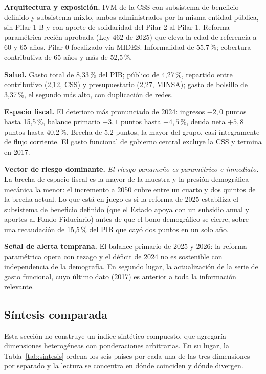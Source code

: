 \documentclass[12pt, letterpaper]{article}
\begin{document}
\textbf{Arquitectura y exposición.} IVM de la CSS con subsistema de beneficio
definido y subsistema mixto, ambos administrados por la misma entidad pública, sin
Pilar 1-B y con aporte de solidaridad del Pilar 2 al Pilar 1. Reforma paramétrica
recién aprobada (Ley 462 de 2025) que eleva la edad de referencia a 60 y 65 años.
Pilar 0 focalizado vía MIDES. Informalidad de 55,7\,\%; cobertura contributiva de
65 años y más de 52,5\,\%.

\textbf{Salud.} Gasto total de 8,33\,\% del PIB; público de 4,27\,\%, repartido
entre contributivo (2,12, CSS) y presupuestario (2,27, MINSA); gasto de bolsillo de
3,37\,\%, el segundo más alto, con duplicación de redes.

\textbf{Espacio fiscal.} El deterioro más pronunciado de 2024: ingresos $-2{,}0$
puntos hasta 15,5\,\%, balance primario $-3{,}1$ puntos hasta $-4{,}5$\,\%, deuda neta
$+5{,}8$ puntos hasta 40,2\,\%. Brecha de 5,2 puntos, la mayor del grupo, casi
íntegramente de flujo corriente. El gasto funcional de gobierno central excluye la
CSS y termina en 2017.

\textbf{Vector de riesgo dominante.} \emph{El riesgo panameño es paramétrico e
inmediato.} La brecha de espacio fiscal es la mayor de la
muestra y la presión demográfica mecánica la menor: el incremento a 2050 cubre
entre un cuarto y dos quintos de la brecha actual. Lo que está en juego es si la
reforma de 2025 estabiliza el subsistema de beneficio definido (que el Estado
apoya con un subsidio anual y aportes al Fondo Fiduciario) antes de que el bono
demográfico se cierre, sobre una recaudación de 15,5\,\% del PIB que cayó dos
puntos en un solo año.

\textbf{Señal de alerta temprana.} El balance primario de 2025 y 2026: la reforma
paramétrica opera con rezago y el déficit de 2024 no es sostenible con
independencia de la demografía. En segundo lugar, la actualización de la serie de
gasto funcional, cuyo último dato (2017) es anterior a toda la información
relevante.

\subsection{Síntesis comparada}
\label{sec:sintesis}

Esta sección no construye un índice sintético compuesto, que agregaría dimensiones
heterogéneas con ponderaciones arbitrarias. En su lugar, la Tabla~\ref{tab:sintesis} ordena los seis países por cada una de las tres
dimensiones por separado y la lectura se concentra en dónde coinciden y dónde
divergen.
\end{document}
